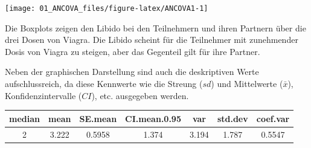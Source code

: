 \documentclass[]{article}
\begin{document}
\begin{center}\texttt{[image: 01\_ANCOVA\_files/figure-latex/ANCOVA1-1]} \end{center}

Die Boxplots zeigen den Libido bei den Teilnehmern und ihren Partnern
über die drei Dosen von Viagra. Die Libido scheint für die Teilnehmer
mit zunehmender Dosis von Viagra zu steigen, aber das Gegenteil gilt für
ihre Partner.

Neben der graphischen Darstellung sind auch die deskriptiven Werte
aufschlussreich, da diese Kennwerte wie die Streung (\(sd\)) und
Mittelwerte (\(\bar{x}\)), Konfidenzintervalle (\(CI\)), etc. ausgegeben
werden.

\begin{longtable}[]{@{}ccccccc@{}}
\toprule
\begin{minipage}[b]{0.10\columnwidth}\centering\strut
median\strut
\end{minipage} & \begin{minipage}[b]{0.09\columnwidth}\centering\strut
mean\strut
\end{minipage} & \begin{minipage}[b]{0.11\columnwidth}\centering\strut
SE.mean\strut
\end{minipage} & \begin{minipage}[b]{0.17\columnwidth}\centering\strut
CI.mean.0.95\strut
\end{minipage} & \begin{minipage}[b]{0.09\columnwidth}\centering\strut
var\strut
\end{minipage} & \begin{minipage}[b]{0.11\columnwidth}\centering\strut
std.dev\strut
\end{minipage} & \begin{minipage}[b]{0.11\columnwidth}\centering\strut
coef.var\strut
\end{minipage}\tabularnewline
\midrule
\endhead
\begin{minipage}[t]{0.10\columnwidth}\centering\strut
2\strut
\end{minipage} & \begin{minipage}[t]{0.09\columnwidth}\centering\strut
3.222\strut
\end{minipage} & \begin{minipage}[t]{0.11\columnwidth}\centering\strut
0.5958\strut
\end{minipage} & \begin{minipage}[t]{0.17\columnwidth}\centering\strut
1.374\strut
\end{minipage} & \begin{minipage}[t]{0.09\columnwidth}\centering\strut
3.194\strut
\end{minipage} & \begin{minipage}[t]{0.11\columnwidth}\centering\strut
1.787\strut
\end{minipage} & \begin{minipage}[t]{0.11\columnwidth}\centering\strut
0.5547\strut
\end{minipage}\tabularnewline
\bottomrule
\end{longtable}
\end{document}
